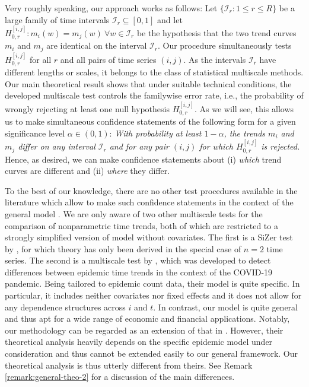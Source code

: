 \documentclass[12pt]{article}
\makeatletter
\renewcommand{\eqref}[1]{\tagform@{\ref{#1}}}
\makeatother
\begin{document}
Very roughly speaking, our approach works as follows: Let $\{\mathcal{I}_r: 1 \le r \le R\}$ be a large family of time intervals $\mathcal{I}_r \subseteq [0,1]$ and let $H_{0,r}^{[i,j]}: m_i(w) = m_j(w) \ \forall w \in \mathcal{I}_r$ be the hypothesis that the two trend curves $m_i$ and $m_j$ are identical on the interval $\mathcal{I}_r$. Our procedure simultaneously tests $H_{0,r}^{[i, j]}$ for all $r$ and all pairs of time series $(i,j)$. As the intervals $\mathcal{I}_r$ have different lengths or scales, it belongs to the class of statistical multiscale methods. Our main theoretical result shows that under suitable technical conditions, the developed multiscale test controls the familywise error rate, i.e., the probability of wrongly rejecting at least one null hypothesis $H_{0,r}^{[i, j]}$. As we will see, this allows us to make simultaneous confidence statements of the following form for a given significance level $\alpha \in (0,1)$: 
\textit{With probability at least $1-\alpha$, the trends $m_i$ and $m_j$ differ on any interval $\mathcal{I}_r$ and for any pair $(i,j)$ for which $H_{0,r}^{[i, j]}$ is rejected.} 
Hence, as desired, we can make confidence statements about (i) \textit{which} trend curves are different and (ii) \textit{where} they differ.


To the best of our knowledge, there are no other test procedures available in the literature which allow to make such confidence statements in the context of the general model \eqref{eq:model_full}. We are only aware of two other multiscale tests for the comparison of nonparametric time trends, both of which are restricted to a strongly simplified version of model \eqref{eq:model_full} without covariates. The first is a SiZer test by \cite{Park2009}, for which theory has only been derived in the special case of $n=2$ time series. The second is a multiscale test by \cite{KhismatullinaVogt2023}, which was developed to detect differences between epidemic time trends in the context of the COVID-19 pandemic. Being tailored to epidemic count data, their model is quite specific. In particular, it includes neither covariates nor fixed effects and it does not allow for any dependence structures across $i$ and $t$. In contrast, our model is quite general and thus apt for a wide range of economic and financial applications. Notably, our methodology can be regarded as an extension of that in \cite{KhismatullinaVogt2023}. However, their theoretical analysis heavily depends on the specific epidemic model under consideration and thus cannot be extended easily to our general framework. Our theoretical analysis is thus utterly different from theirs. See Remark \ref{remark:general-theo-2} for a discussion of the main differences. 
\end{document}
